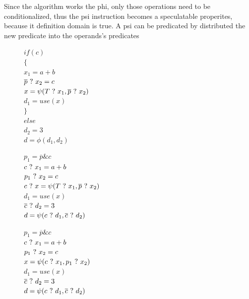 Since the algorithm works the phi, only those operations need to be conditionalized, thus the psi instruction becomes a speculatable properites, because it definition domain is true. A psi can be predicated by distributed the new predicate into the operands's predicates

\begin{figure}
\footnotesize
\begin{minipage}[t]{4cm}
$ if (c) $ \\
$ \{ $ \\
\hspace*{2mm}$ x_1 = a + b $ \\
\hspace*{2mm}$ \overline{p} ~?~ x_2 = c $ \\
\hspace*{2mm}$ x = \psi(T ~?~ x_1, \overline{p} ~?~ x_2) $ \\
\hspace*{2mm}$ d_1 = use (x) $ \\
$ \} $ \\
$ else $ \\
\hspace*{2mm}$ d_2 = 3 $ \\
$ d = \phi(d_1,d_2) $ \\
\end{minipage}

\begin{minipage}[t]{4cm}
$ p_1 = \overline{p} \& {c} $ \\
$ c ~?~ x_1 = a + b $ \\
$ p_1 ~?~ x_2 = c $ \\
$ c ~?~ x = \psi(T ~?~ x_1, \overline{p} ~?~ x_2) $ \\
$ d_1 = use (x) $ \\
$ \overline{c} ~?~ d_2 = 3 $ \\
$ d = \psi(c ~?~ d_1, \overline{c} ~?~ d_2) $ \\
\end{minipage}

\begin{minipage}[t]{4cm}
$ p_1 = \overline{p} \& {c} $ \\
$ c ~?~ x_1 = a + b $ \\
$ p_1 ~?~ x_2 = c $ \\
$ x = \psi(c ~?~ x_1, p_1 ~?~ x_2) $ \\
$ d_1 = use (x) $ \\
$ \overline{c} ~?~ d_2 = 3 $ \\
$ d = \psi(c ~?~ d_1, \overline{c} ~?~ d_2) $ \\
\end{minipage}
\end{figure}

